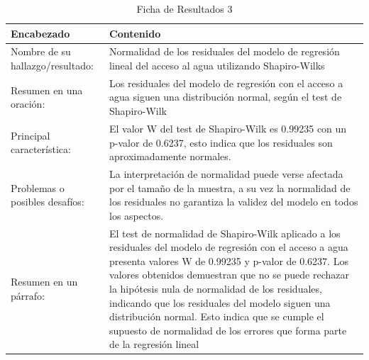 \begin{table}[H]
    \caption{Ficha de Resultados 3}
    \begin{center}
        \begin{tabular}{  m{3cm} | m{12cm}  }
        \hline
        \textbf{ Encabezado} & \textbf{Contenido }\\ 
        \hline
        Nombre de su hallazgo/resultado: & Normalidad de los residuales del modelo de regresión lineal del acceso al agua utilizando Shapiro-Wilks\\ 
        \hline
        Resumen en una oración: & Los residuales del modelo de regresión con el acceso a agua siguen una distribución normal, según el test de Shapiro-Wilk\\ 
        \hline
        Principal característica: & El valor W del test de Shapiro-Wilk es 0.99235 con un p-valor de 0.6237, esto indica que los residuales son aproximadamente normales.\\ 
        \hline
        Problemas o posibles desafíos: & La interpretación de normalidad puede verse afectada por el tamaño de la muestra, a su vez la normalidad de los residuales no garantiza la validez del modelo en todos los aspectos.\\ 
        \hline
        Resumen en un párrafo: & El test de normalidad de Shapiro-Wilk aplicado a los residuales del modelo de regresión con el acceso a agua presenta valores W de 0.99235 y p-valor de 0.6237. Los valores obtenidos demuestran que no se puede rechazar la hipótesis nula de normalidad de los residuales, indicando que los residuales del modelo siguen una distribución normal. Esto indica que se cumple el supuesto de normalidad de los errores que forma parte de la regresión lineal\\ 
        \hline
        \end{tabular}
    \end{center}
\end{table}

